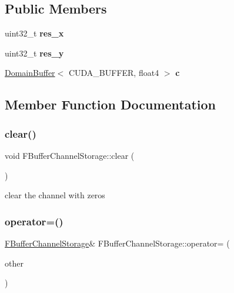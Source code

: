 \subsection*{Public Members}
\begin{DoxyCompactItemize}
\item 
\mbox{\label{struct_f_buffer_channel_storage_a3e84f2025da610cce330d7dd2e558ba6}} 
uint32\+\_\+t {\bfseries res\+\_\+x}
\item 
\mbox{\label{struct_f_buffer_channel_storage_a8a237bd2ab9f0675ab0083187398a806}} 
uint32\+\_\+t {\bfseries res\+\_\+y}
\item 
\mbox{\label{struct_f_buffer_channel_storage_a2d1131bcca4bd4f2df3b74aeae1badc4}} 
\hyperlink{class_domain_buffer}{Domain\+Buffer}$<$ C\+U\+D\+A\+\_\+\+B\+U\+F\+F\+ER, float4 $>$ {\bfseries c}
\end{DoxyCompactItemize}


\subsection{Member Function Documentation}
\mbox{\label{struct_f_buffer_channel_storage_a329a7a82c5c066eb4910cdf1694ae38c}} 
\subsubsection{\texorpdfstring{clear()}{clear()}}
{\footnotesize\ttfamily void F\+Buffer\+Channel\+Storage\+::clear (\begin{DoxyParamCaption}{ }\end{DoxyParamCaption})\hspace{0.3cm}{\ttfamily [inline]}}

clear the channel with zeros \mbox{\label{struct_f_buffer_channel_storage_a071ed06855db0e5fe595b6b7d8757fda}} 
\subsubsection{\texorpdfstring{operator=()}{operator=()}}
{\footnotesize\ttfamily \hyperlink{struct_f_buffer_channel_storage}{F\+Buffer\+Channel\+Storage}\& F\+Buffer\+Channel\+Storage\+::operator= (\begin{DoxyParamCaption}\item[{\hyperlink{struct_f_buffer_channel_storage}{F\+Buffer\+Channel\+Storage} \&}]{other }\end{DoxyParamCaption})\hspace{0.3cm}{\ttfamily [inline]}}

